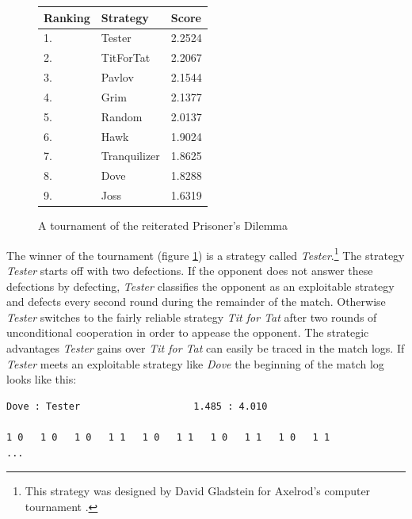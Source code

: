 \begin{figure}
\begin{center}
\begin{tabular}{lll}

Ranking & Strategy        & Score \\ \hline

1.      & Tester          & 2.2524 \\
2.      & TitForTat       & 2.2067 \\
3.      & Pavlov          & 2.1544 \\
4.      & Grim            & 2.1377 \\
5.      & Random          & 2.0137 \\
6.      & Hawk            & 1.9024 \\
7.      & Tranquilizer    & 1.8625 \\
8.      & Dove            & 1.8288 \\
9.      & Joss            & 1.6319 \\

\end{tabular}
\caption{\label{BasicTournament} A tournament of the reiterated
Prisoner's Dilemma}
\end{center}
\end{figure}

The winner of the tournament (figure \ref{BasicTournament}) is a strategy
called {\em Tester}.\footnote{This strategy was designed by David Gladstein
for Axelrod's computer tournament \cite[p.\  39]{axelrod:1984}.} The strategy
{\em Tester} starts off with two defections. If the opponent does not answer
these defections by defecting, {\em Tester}
classifies the opponent as an exploitable strategy and defects every second
round during the remainder of the match.  Otherwise {\em Tester} switches to
the fairly reliable strategy {\em Tit for Tat} after two rounds of
unconditional cooperation in order to appease the opponent. The strategic
advantages {\em Tester} gains over {\em Tit for Tat} can easily be traced in
the match logs. If {\em Tester} meets an exploitable strategy like {\em Dove}
the beginning of the match log looks like this:

\begin{verbatim}
Dove : Tester                    1.485 : 4.010

1 0   1 0   1 0   1 1   1 0   1 1   1 0   1 1   1 0   1 1 
...
\end{verbatim}

